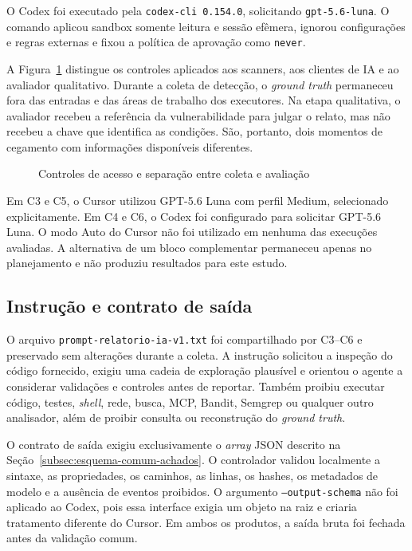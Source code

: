 O Codex foi executado pela \texttt{codex-cli 0.154.0}, solicitando \texttt{gpt-5.6-luna}. O comando aplicou sandbox somente leitura e sessão efêmera, ignorou configurações e regras externas e fixou a política de aprovação como \texttt{never}.

A Figura~\ref{fig:isolamento} distingue os controles aplicados aos scanners, aos clientes de IA e ao avaliador qualitativo. Durante a coleta de detecção, o \textit{ground truth} permaneceu fora das entradas e das áreas de trabalho dos executores. Na etapa qualitativa, o avaliador recebeu a referência da vulnerabilidade para julgar o relato, mas não recebeu a chave que identifica as condições. São, portanto, dois momentos de cegamento com informações disponíveis diferentes.

\begin{figure}[htbp]
\centering
\caption{\label{fig:isolamento}Controles de acesso e separação entre coleta e avaliação}

\end{figure}

Em C3 e C5, o Cursor utilizou GPT-5.6 Luna com perfil Medium, selecionado explicitamente. Em C4 e C6, o Codex foi configurado para solicitar GPT-5.6 Luna. O modo Auto do Cursor não foi utilizado em nenhuma das execuções avaliadas. A alternativa de um bloco complementar permaneceu apenas no planejamento e não produziu resultados para este estudo.

\subsection{Instrução e contrato de saída}\label{subsec:padronizacao-prompts}

O arquivo \texttt{prompt-relatorio-ia-v1.txt} foi compartilhado por C3--C6 e preservado sem alterações durante a coleta. A instrução solicitou a inspeção do código fornecido, exigiu uma cadeia de exploração plausível e orientou o agente a considerar validações e controles antes de reportar. Também proibiu executar código, testes, \textit{shell}, rede, busca, MCP, Bandit, Semgrep ou qualquer outro analisador, além de proibir consulta ou reconstrução do \textit{ground truth}.

O contrato de saída exigiu exclusivamente o \textit{array} JSON descrito na Seção~\ref{subsec:esquema-comum-achados}. O controlador validou localmente a sintaxe, as propriedades, os caminhos, as linhas, os hashes, os metadados de modelo e a ausência de eventos proibidos. O argumento \texttt{--output-schema} não foi aplicado ao Codex, pois essa interface exigia um objeto na raiz e criaria tratamento diferente do Cursor. Em ambos os produtos, a saída bruta foi fechada antes da validação comum.

